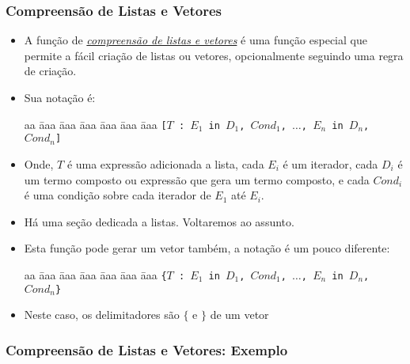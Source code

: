 \begin{frame}[c,allowframebreaks]

\frametitle{Compreensão de Listas e Vetores}    
    
\begin{itemize}    
    \item A função de \underline{\textit{compreensão de listas e vetores}} é uma função especial que  permite a fácil criação de listas ou vetores, opcionalmente seguindo uma regra de 
    criação.
    
    \item Sua notação é:
    
    \begin{tabbing}
        aa \= aaa \= aaa \= aaa \= aaa \= aaa \= aaa \kill
        \> \> \texttt{[$T$ : $E_1$ \texttt{in} $D_1$, $Cond_1$, $\ldots$, $E_n$ in $D_n$, $Cond_n$]} 
    \end{tabbing}
    
    \item Onde, $T$ é uma expressão  adicionada a lista, cada $E_i$ é um 
    iterador, cada $D_i$ é um termo composto ou expressão que gera um termo composto, e cada $Cond_i$ é uma condição sobre cada iterador de $E_1$ até $E_i$.
    
    \item Há uma seção dedicada a listas. Voltaremos ao assunto.
    
    \framebreak

    \item Esta função pode gerar um vetor também, a notação é um pouco diferente:
    
    \begin{tabbing}
        aa \= aaa \= aaa \= aaa \= aaa \= aaa \= aaa \kill
        \> \> \texttt{\{$T$ : $E_1$ \texttt{in} $D_1$, $Cond_1$, $\ldots$, $E_n$ in $D_n$, $Cond_n$\}} 
    \end{tabbing}
    
    \item Neste caso, os delimitadores são $\{$ e $\}$ de um vetor

\end{itemize}

\end{frame}      

 \begin{frame}
 \frametitle{Compreensão de Listas e Vetores: Exemplo}
%           

%
 
%
 \end{frame}
%


